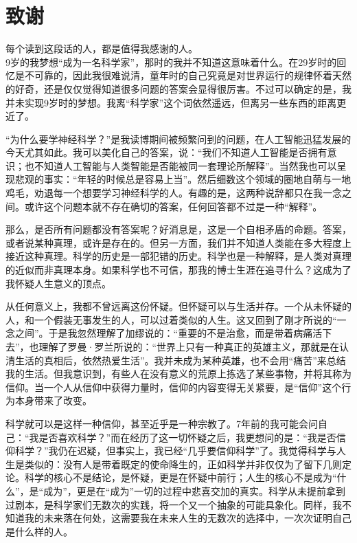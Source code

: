\chapter[致谢]{致\quad 谢}%

每个读到这段话的人，都是值得我感谢的人。\\

9岁的我梦想“成为一名科学家”，那时的我并不知道这意味着什么。在29岁时的回忆是不可靠的，因此我很难说清，童年时的自己究竟是对世界运行的规律怀着天然的好奇，还是仅仅觉得知道很多问题的答案会显得很厉害。不过可以确定的是，我并未实现9岁时的梦想。我离“科学家”这个词依然遥远，但离另一些东西的距离更近了。

“为什么要学神经科学？”是我读博期间被频繁问到的问题，在人工智能迅猛发展的今天尤其如此。我可以美化自己的答案，说：“我们不知道人工智能是否拥有意识；也不知道人工智能与人类智能是否能被同一套理论所解释”。当然我也可以呈现悲观的事实：“年轻的时候总是容易上当”。然后细数这个领域的圈地自萌与一地鸡毛，劝退每一个想要学习神经科学的人。有趣的是，这两种说辞都只在我一念之间。或许这个问题本就不存在确切的答案，任何回答都不过是一种“解释”。

那么，是否所有问题都没有答案呢？好消息是，这是一个自相矛盾的命题。答案，或者说某种真理，或许是存在的。但另一方面，我们并不知道人类能在多大程度上接近这种真理。科学的历史是一部犯错的历史。科学也是一种解释，是人类对真理的近似而非真理本身。如果科学也不可信，那我的博士生涯在追寻什么？这成为了我怀疑人生意义的顶点。

从任何意义上，我都不曾远离这份怀疑。但怀疑可以与生活并存。一个从未怀疑的人，和一个假装无事发生的人，可以过着类似的人生。这又回到了刚才所说的“一念之间”。于是我忽然理解了加缪说的：“重要的不是治愈，而是带着病痛活下去”，也理解了罗曼·罗兰所说的：“世界上只有一种真正的英雄主义，那就是在认清生活的真相后，依然热爱生活”。我并未成为某种英雄，也不会用“痛苦”来总结我的生活。但我意识到，有些人在没有意义的荒原上拣选了某些事物，并将其称为信仰。当一个人从信仰中获得力量时，信仰的内容变得无关紧要，是“信仰”这个行为本身带来了改变。

科学就可以是这样一种信仰，甚至近乎是一种宗教了。7年前的我可能会问自己：“我是否喜欢科学？”而在经历了这一切怀疑之后，我更想问的是：“我是否信仰科学？”我仍在迟疑，但事实上，我已经“几乎要信仰科学”了。我觉得科学与人生是类似的：没有人是带着既定的使命降生的，正如科学并非仅仅为了留下几则定论。科学的核心不是结论，是怀疑，更是在怀疑中前行；人生的核心不是成为“什么”，是“成为”，更是在“成为”一切的过程中悲喜交加的真实。科学从未提前拿到过剧本，是科学家们无数次的实践，将一个又一个抽象的可能具象化。同样，我不知道我的未来落在何处，这需要我在未来人生的无数次的选择中，一次次证明自己是什么样的人。

